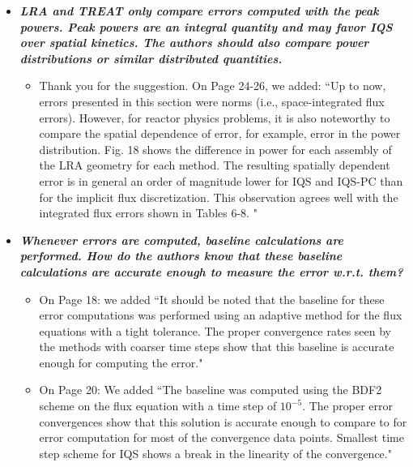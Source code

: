 \documentclass{elsarticle}
\newcommand{\done}{\checkmark}
\newcommand{\medm}[1]{\textbf{\textit{#1}}}
\newcommand{\hard}[1]{\textbf{\textit{#1}}}
\begin{document}
\begin{itemize}
\item[\done] \hard{ LRA and TREAT only compare errors computed with the peak powers. Peak powers are an integral quantity and may favor IQS over spatial kinetics. The authors should also compare power distributions or similar distributed quantities. }
\begin{itemize}
\item Thank you for the suggestion. On Page 24-26, we added: ``Up to now, errors presented in this section were norms (i.e., space-integrated flux errors). However, for reactor physics problems, it is also noteworthy to compare the spatial dependence of error, for example, error in the power distribution. Fig. 18 shows the difference in power for each assembly of the LRA geometry for each method. The resulting spatially dependent error is in general an order of magnitude lower for IQS and IQS-PC than for the implicit flux discretization. This observation agrees well with the integrated flux errors shown in Tables 6-8. "
\end{itemize}
%

\item[\done] \medm{  Whenever errors are computed, baseline calculations are performed. How do the authors know that these baseline calculations are accurate enough to measure the error w.r.t. them? }
\begin{itemize}
\item On Page 18: we added ``It should be noted that the baseline for these error computations was performed using an adaptive method for the flux equations with a tight tolerance. The proper convergence rates seen by the methods with coarser time steps show that this baseline is accurate enough for computing the error."
\item On Page 20: We added ``The baseline was computed using the BDF2 scheme on the flux equation with a time step of $10^{-5}$. The proper error convergences show that this solution is accurate enough to compare to for error computation for most of the convergence data points. Smallest time step scheme for IQS shows a break in the linearity of the convergence."
\end{itemize}

\end{itemize}
\end{document}

